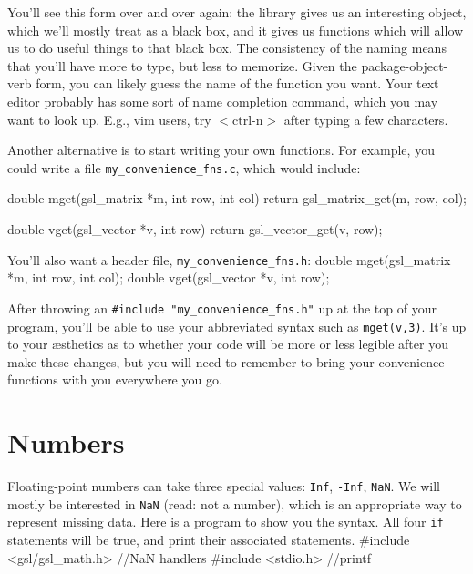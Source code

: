 You'll see this form over and over again: the library gives us an interesting
object, which we'll mostly treat as a black box, and it gives us functions which
will allow us to do useful things to that black box. The consistency of the
naming means that you'll have more to type, but less to memorize. Given
the package-object-verb form, you can likely guess the name of the
function you want. Your text editor probably has some sort of name
completion command, which you may want to look up. E.g., vim users,
try $<$ctrl-n$>$ after typing a few characters.

Another alternative is to start writing your own functions. For example, you
could write a file {\tt my\_convenience\_fns.c}, which would include:

double mget(gsl_matrix *m, int row, int col){
   return gsl_matrix_get(m, row, col);
}

double vget(gsl_vector *v, int row){
   return gsl_vector_get(v, row);
}

You'll also want a header file, {\tt my\_convenience\_fns.h}:
double mget(gsl_matrix *m, int row, int col);
double vget(gsl_vector *v, int row);

After throwing an {\tt \#include "my\_convenience\_fns.h"} up at the top of your
program, you'll be able to use your abbreviated syntax such as {\tt mget(v,3)}.
It's up to your \ae sthetics as to whether your code will be more or less
legible after you make these changes, but you will need to remember to
bring your convenience functions with you everywhere you go.


\section{Numbers}      
Floating-point numbers can take three special values: {\tt Inf}, {\tt -Inf}, {\tt NaN}. We will mostly be
interested in {\tt NaN} (read: not a number), which is an appropriate way to represent missing data. Here is a
program to show you the syntax. All four {\tt if} statements will be true, and print their associated
statements.
#include <gsl/gsl_math.h>   //NaN handlers
#include <stdio.h>          //printf

